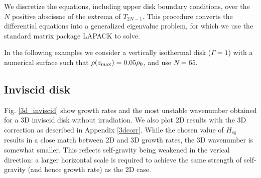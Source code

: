 We discretize the equations, including upper disk boundary conditions,
over the $N$ positive abscissae of the extrema of $T_{2N-1}$. This
procedure converts the differential equations into a generalized
eigenvalue problem, for which we use the standard matrix package
LAPACK to solve.  

In the following examples we consider a vertically isothermal disk
($\Gamma=1$) with a numerical surface such 
that $\rho(z_\mathrm{max})=0.05\rho_0$, and use $N=65$. 

\subsection{Inviscid disk}

Fig. \ref{3d_inviscid} show growth rates and the most unstable wavenumber
obtained for a 3D inviscid disk without irradiation. We also plot 2D
results with the 3D correction as described in Appendix
\ref{3dcorr}. While the chosen value of $H_\mathrm{sg}$ results in a close
match between 2D and 3D growth rates, the 3D wavenumber is somewhat
smaller. This reflects self-gravity being weakened in the verical
direction: a larger horizontal scale is required to achieve the same
strength of self-gravity (and hence growth rate) as the 2D case.  

